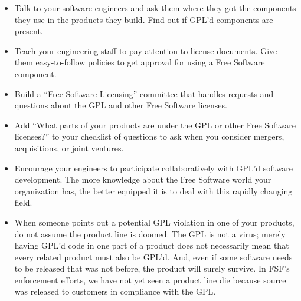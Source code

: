 \begin{itemize}

\item Talk to your software engineers and ask them where they got the
  components they use in the products they build. Find out if GPL'd
  components are present.

\item Teach your engineering staff to pay attention to license documents.
  Give them easy-to-follow policies to get approval for using a Free
  Software component.

\item Build a ``Free Software Licensing'' committee that handles requests
  and questions about the GPL and other Free Software licenses.

\item Add ``What parts of your products are under the GPL or other Free
  Software licenses?'' to your checklist of questions to ask when you
  consider mergers, acquisitions, or joint ventures.

\item Encourage your engineers to participate collaboratively with GPL'd
  software development. The more knowledge about the Free Software world
  your organization has, the better equipped it is to deal with this
  rapidly changing field.

\item When someone points out a potential GPL violation in one of your
  products, do not assume the product line is doomed. The GPL is not a virus;
  merely having GPL'd code in one part of a product does not necessarily
  mean that every related product must also be GPL'd. And, even if some
  software needs to be released that was not before, the product will
  surely survive. In FSF's enforcement efforts, we have not yet
  seen a product line die because source was released to customers in
  compliance with the GPL.

\end{itemize}

